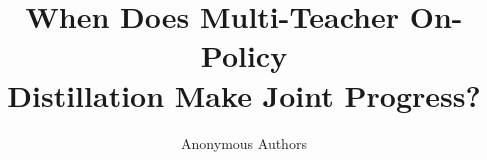 \documentclass{article} %
\title{When Does Multi-Teacher On-Policy\\Distillation Make Joint Progress?}
\author{Anonymous Authors}
\theoremstyle{remark}
\begin{document}
\maketitle













\appendix

\setcounter{table}{0}
\renewcommand{\thetable}{A\arabic{table}}


\end{document}
